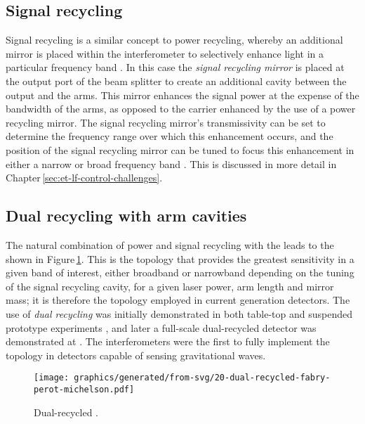 \subsection{\label{sec:signal-recycling}Signal recycling}
Signal recycling is a similar concept to power recycling, whereby an additional mirror is placed within the interferometer to selectively enhance light in a particular frequency band \cite{Meers1988}. In this case the \emph{signal recycling mirror} is placed at the output port of the beam splitter to create an additional cavity between the output and the arms. This mirror enhances the signal power at the expense of the bandwidth of the arms, as opposed to the carrier enhanced by the use of a power recycling mirror. The signal recycling mirror's transmissivity can be set to determine the frequency range over which this enhancement occurs, and the position of the signal recycling mirror can be tuned to focus this enhancement in either a narrow or broad frequency band \cite{Buonanno2001}. This is discussed in more detail in Chapter\,\ref{sec:et-lf-control-challenges}.

\subsection{Dual recycling with \FP{} arm cavities}
The natural combination of power and signal recycling with the \FPMI{} leads to the \emph{\DRFPMI{}} shown in Figure\,\ref{fig:drfpmi}. This is the topology that provides the greatest sensitivity in a given band of interest, either broadband or narrowband depending on the tuning of the signal recycling cavity, for a given laser power, arm length and mirror mass; it is therefore the topology employed in current generation detectors. The use of \emph{dual recycling} was initially demonstrated in both table-top and suspended prototype experiments \cite{Strain1991, Heinzel1998, Freise2000}, and later a full-scale dual-recycled \MI{} detector was demonstrated at \GEO{} \cite{Heinzel2002, Grote2004}. The \ALIGO{} interferometers were the first to fully implement the \DRFPMI{} topology in detectors capable of sensing gravitational waves.

\begin{figure}
  \centering
  \texttt{[image: graphics/generated/from-svg/20-dual-recycled-fabry-perot-michelson.pdf]}
  \caption[Dual-recycled \FPMI{}]{\label{fig:drfpmi}Dual-recycled \FPMI{}.}
\end{figure}

